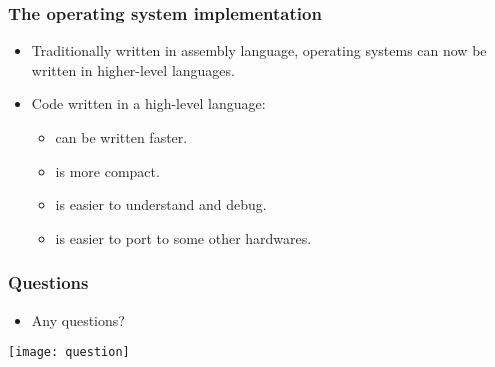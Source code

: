 \documentclass[CJKutf8,dvipsnames,table]{beamer}
\newif\ifxetexorluatex %
\begin{document}
\begin{CJK*}{UTF8}{song}
  \begin{frame}
    \frametitle{The operating system implementation} \pause
    \begin{itemize}
    \item Traditionally written in assembly language, operating systems can now be written in higher-level languages.  \pause
    \item Code written in a high-level language:  \pause
      \begin{itemize}
      \item can be written faster.  \pause
      \item is more compact.  \pause
      \item is easier to understand and debug.  \pause
      \item is easier to port to some other hardwares. 
      \end{itemize}
    \end{itemize}
  \end{frame}
  
  \begin{frame}
    \frametitle{Questions}
    \begin{itemize}
    \item Any questions? 
    \end{itemize}
    \begin{center}
      \texttt{[image: question]}
    \end{center}
  \end{frame}
  
\ifxetexorluatex\else
\end{CJK*}
\fi
\end{document}
